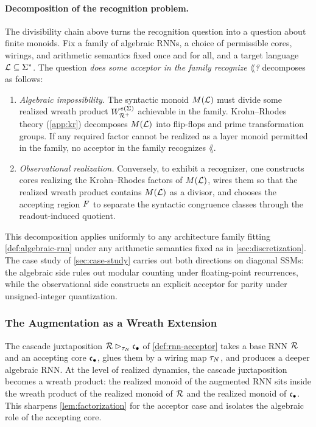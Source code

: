 \documentclass{article}
\begin{document}
\paragraph{Decomposition of the recognition problem.}
The divisibility chain above turns the recognition question into a question about finite monoids. 
Fix a family of algebraic RNNs, a choice of permissible cores, wirings, and arithmetic semantics fixed once and for all, and a target language $\mathcal{L} \subseteq \Sigma^*$. 
The question \emph{does some acceptor in the family recognize $\lang$?} decomposes as follows: 
\begin{enumerate}[label=(\roman*), leftmargin=*, itemsep=2pt]
\item \emph{Algebraic impossibility.} The syntactic monoid $M(\mathcal{L})$ must divide some realized wreath product $W_{{\mathcal{R}^{+}}}^{e(\Sigma)}$ achievable in the family. 
Krohn--Rhodes theory (\cref{app:kr}) decomposes $M(\mathcal{L})$ into flip-flops and prime transformation groups. 
If any required factor cannot be realized as a layer monoid permitted in the family, no acceptor in the family recognizes $\lang$.
\item \emph{Observational realization.} Conversely, to exhibit a recognizer, one constructs cores realizing the Krohn--Rhodes factors of $M(\mathcal{L})$, wires them so that the realized wreath product contains $M(\mathcal{L})$ as a divisor, and chooses the accepting region $F$ to separate the syntactic congruence classes through the readout-induced quotient.
\end{enumerate}

This decomposition applies uniformly to any architecture family fitting \cref{def:algebraic-rnn} under any arithmetic semantics fixed as in \cref{sec:discretization}. 
The case study of \cref{sec:case-study} carries out both directions on diagonal SSMs: the algebraic side rules out modular counting under floating-point recurrences, while the observational side constructs an explicit acceptor for parity under unsigned-integer quantization.

\subsubsection{The Augmentation as a Wreath Extension}\label{sec:augmentation-wreath}

The cascade juxtaposition $\mathcal{R} \mathbin{\rhd_{\tau_N}} {\mathfrak{c}_{\bullet}}$ of \cref{def:rnn-acceptor} takes a base RNN $\mathcal{R}$ and an accepting core ${\mathfrak{c}_{\bullet}}$, glues them by a wiring map $\tau_N$, and produces a deeper algebraic RNN. 
At the level of realized dynamics, the cascade juxtaposition becomes a wreath product: the realized monoid of the augmented RNN sits inside the wreath product of the realized monoid of $\mathcal{R}$ and the realized monoid of ${\mathfrak{c}_{\bullet}}$. This sharpens \cref{lem:factorization} for the acceptor case and isolates the algebraic role of the accepting core.
\end{document}
